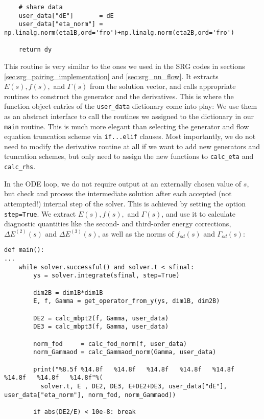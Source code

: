 {\begin{lstlisting}
    # share data
    user_data["dE"]       = dE
    user_data["eta_norm"] = np.linalg.norm(eta1B,ord='fro')+np.linalg.norm(eta2B,ord='fro')
    
    return dy
\end{lstlisting}
This routine is very similar to the ones we used in the SRG
codes in sections \ref{sec:srg_pairing_implementation} and \ref{sec:srg_nn_flow}. It extracts
$E(s), f(s),$ and $\Gamma(s)$ from the solution vector, and calls 
appropriate routines to construct the generator and the derivatives.
This is where the function object entries of the \texttt{user\_data}
dictionary come into play: We use them as an abstract interface
to call the routines we assigned to the dictionary in our \texttt{main} 
routine. This is much more elegant than selecting the generator and
flow equation truncation scheme via \texttt{if...elif} clauses. Most 
importantly, we do not need to modify the derivative routine at all 
if we want to add new generators and truncation schemes, but only
need to assign the new functions to \texttt{calc\_eta} and 
\texttt{calc\_rhs}.

In the ODE loop, we do not require output at an externally chosen
value of $s$, but check and process the intermediate solution after
each accepted (not attempted!) internal step of the solver. This is
achieved by setting the option \texttt{step=True}. We extract 
$E(s), f(s),$ and $\Gamma(s)$, and use it to calculate diagnostic
quantities like the second- and third-order energy corrections, 
$\Delta E^{(2)}(s)$ and $\Delta E^{(3)}(s)$, as well as the norms 
of $f_{od}(s)$ and $\Gamma_{od}(s)$:  
\begin{lstlisting}
def main():
...
    while solver.successful() and solver.t < sfinal:
        ys = solver.integrate(sfinal, step=True)
        
        dim2B = dim1B*dim1B
        E, f, Gamma = get_operator_from_y(ys, dim1B, dim2B)

        DE2 = calc_mbpt2(f, Gamma, user_data)
        DE3 = calc_mbpt3(f, Gamma, user_data)

        norm_fod     = calc_fod_norm(f, user_data)
        norm_Gammaod = calc_Gammaod_norm(Gamma, user_data)

        print("%8.5f %14.8f   %14.8f   %14.8f   %14.8f   %14.8f   %14.8f   %14.8f   %14.8f"%(
          solver.t, E , DE2, DE3, E+DE2+DE3, user_data["dE"], user_data["eta_norm"], norm_fod, norm_Gammaod))

        if abs(DE2/E) < 10e-8: break


\end{lstlisting}}
